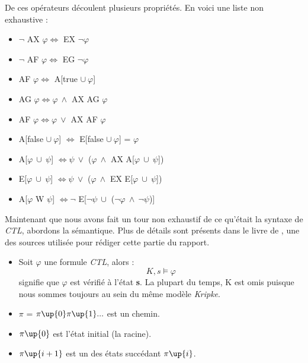 \documentclass[runningheads,a4paper]{llncs}
\begin{document}
\noindent De ces opérateurs découlent plusieurs propriétés. En voici une liste non exhaustive : 
\begin{itemize}
\item $\lnot$ AX $\varphi \Leftrightarrow $ EX $\lnot \varphi$
\item $\lnot$ AF $\varphi \Leftrightarrow $ EG $\lnot \varphi$
\item AF $\varphi \Leftrightarrow $ A[true $\cup \ \varphi$]
\item AG $\varphi \Leftrightarrow \varphi \ \land$ AX AG $\varphi$
\item AF $\varphi \Leftrightarrow \varphi \ \lor$ AX AF $\varphi$
\item A[false $\cup \ \varphi$] $ \Leftrightarrow $ E[false $\cup \ \varphi$] = $\varphi$
\item A[$\varphi \ \cup \ \psi$] $ \Leftrightarrow \psi \ \lor$ ($\varphi \ \land$ AX A[$\varphi \ \cup \ \psi$])
\item E[$\varphi \ \cup \ \psi$] $ \Leftrightarrow \psi \ \lor$ ($\varphi \ \land$ EX E[$\varphi \ \cup \ \psi$])
\item A[$\varphi$ W $\psi$] $ \Leftrightarrow \lnot$ E[$\lnot \psi \ \cup$ ($\lnot \varphi \ \land \ \lnot \psi$)]\\
\end{itemize}

\noindent Maintenant que nous avons fait un tour non exhaustif de ce qu'était la syntaxe de \textit{CTL}, abordons la sémantique. Plus de détails sont présents dans le livre de \cite{principle}, une des sources utilisée pour rédiger cette partie du rapport.  \\

\begin{itemize}
\item Soit $\varphi$ une formule \textit{CTL}, alors : $$K, s \vDash \varphi$$ signifie que $\varphi$ est vérifié à l'état \textbf{s}. La plupart du temps, K est omis puisque nous sommes toujours au sein du même modèle \textit{Kripke}.\\
\item $\pi$ = $\pi\up{0} \pi\up{1} ...$ est un chemin.
\item $\pi\up{0}$ est l'état initial (la racine).
\item $\pi\up{i+1}$ est un des états succédant $\pi\up{i}$.\\
\end{itemize}
\end{document}
